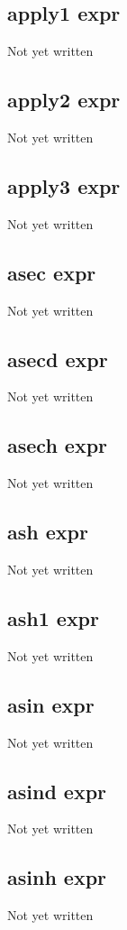 \documentclass[a4paper,11pt]{article}
\begin{document}
\subsection{\ttfamily apply1 expr}
Not yet written

\subsection{\ttfamily apply2 expr}
Not yet written

\subsection{\ttfamily apply3 expr}
Not yet written

\subsection{\ttfamily asec expr}
Not yet written

\subsection{\ttfamily asecd expr}
Not yet written

\subsection{\ttfamily asech expr}
Not yet written

\subsection{\ttfamily ash expr}
Not yet written

\subsection{\ttfamily ash1 expr}
Not yet written

\subsection{\ttfamily asin expr}
Not yet written

\subsection{\ttfamily asind expr}
Not yet written

\subsection{\ttfamily asinh expr}
Not yet written
\end{document}
